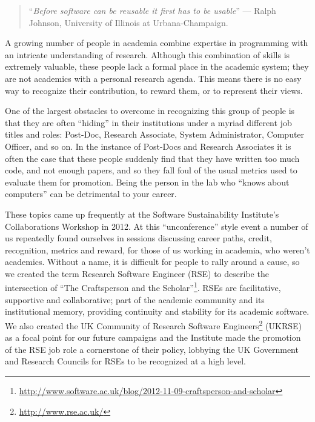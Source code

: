 \documentclass[a4paper,UKenglish]{dagrep}
\begin{document}

\begin{quote}
``\textit{Before software can be reusable it first has to be usable}'' --- Ralph Johnson, University of Illinois at Urbana-Champaign.
\end{quote}

A growing number of people in academia combine expertise in programming with an intricate understanding of research. Although this combination of skills is extremely valuable, these people lack a formal place in the academic system; they are not academics with a personal research agenda. This means there is no easy way to recognize their contribution, to reward them, or to represent their views.

One of the largest obstacles to overcome in recognizing this group of people is that they are often ``hiding'' in their institutions under a myriad different job titles and roles: Post-Doc, Research Associate, System Administrator, Computer Officer, and so on. In the instance of Post-Docs and Research Associates it is often the case that these people suddenly find that they have written too much code, and not enough papers, and so they fall foul of the usual metrics used to evaluate them for promotion. Being the person in the lab who ``knows about computers'' can be detrimental to your career.

These topics came up frequently at the Software Sustainability Institute's Collaborations Workshop in 2012. At this ``unconference'' style event a number of us repeatedly found ourselves in sessions discussing career paths, credit, recognition, metrics and reward, for those of us working in academia, who weren't academics. Without a name, it is difficult for people to rally around a cause, so we created the term Research Software Engineer (RSE) to describe the intersection of ``The Craftsperson and the Scholar''\footnote{\url{http://www.software.ac.uk/blog/2012-11-09-craftsperson-and-scholar}}. RSEs are facilitative, supportive and collaborative; part of the academic community and its institutional memory, providing continuity and stability for its academic software. We also created the UK Community of Research Software Engineers\footnote{\url{http://www.rse.ac.uk/}} (UKRSE) as a focal point for our future campaigns and the Institute made the promotion of the RSE job role a cornerstone of their policy, lobbying the UK Government and Research Councils for RSEs to be recognized at a high level.
\end{document}
